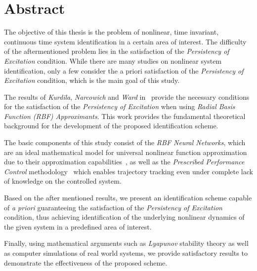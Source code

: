 \chapter*{Abstract}

The objective of this thesis is the problem of nonlinear, time invariant, continuous time system identification in a certain area of interest. The difficulty of the aftermentioned problem lies in the satisfaction of the \textit{Persistency of Excitation} condition. While there are many studies on nonlinear system identification, only a few consider the a priori satisfaction of the \textit{Persistency of Excitation} condition, which is the main goal of this study.

The results of \textit{Kurdila}, \textit{Narcowich} and \textit{Ward} in~\cite{kurdila1995persistency} provide the necessary conditions for the satisfaction of the \textit{Persistency of Excitation} when using \textit{Radial Basis Function (RBF) Approximants}. This work provides the fundamental theoretical background for the development of the proposed identification scheme.

The basic components of this study consist of the \textit{RBF Neural Networks}, which are an ideal mathematical model for universal nonlinear function approximation due to their approximation capabilities~\cite{park1991universal}, as well as the \textit{Prescribed Performance Control} methodology~\cite{bechlioulis2008robust} which enables trajectory tracking even under complete lack of knowledge on the controlled system.  

Based on the after mentioned results, we present an identification scheme capable of \textit{a priori} guaranteeing the satisfaction of the \textit{Persistency of Excitation} condition, thus achieving identification of the underlying nonlinear dynamics of the given system in a predefined area of interest.

Finally, using mathematical arguments such as \textit{Lyapunov} stability theory as well as computer simulations of real world systems, we provide satisfactory results to demonstrate the effectiveness of the proposed scheme. 
